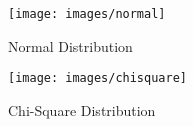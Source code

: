 \begin{figure}[H]
\begin{center}
  \texttt{[image: images/normal]}
  \caption{Normal Distribution}
  \label{fig:normal}
\end{center}
\end{figure}
\begin{figure}[H]
\begin{center}
  \texttt{[image: images/chisquare]}
  \caption{Chi-Square Distribution}
  \label{fig:chisquare}
\end{center}
\end{figure}
